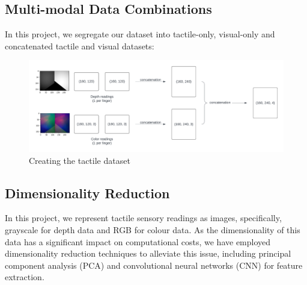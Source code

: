 \documentclass[11pt, a4paper]{report}
\begin{document}
\subsection{Multi-modal Data Combinations}
\label{sec:4.4.1}
In this project, we segregate our dataset into tactile-only, visual-only and concatenated tactile and visual datasets:
\begin{table}[H]
    \centering
    \caption{Dataset combinations}
    \label{tab:4.1}
\end{table}
\begin{figure}[H]
    \centering
    \includegraphics[width=\textwidth]{docs/Project Report/Media/tactile_dataset_creation.png}
    \caption{Creating the tactile dataset}
    \label{fig:4.6}
\end{figure}


\subsection{Dimensionality Reduction}
\label{sec:4.4.2}
In this project, we represent tactile sensory readings as images, specifically, grayscale for depth data and RGB for colour data. As the dimensionality of this data has a significant impact on computational costs, we have employed dimensionality reduction techniques to alleviate this issue, including principal component analysis (PCA) and convolutional neural networks (CNN) for feature extraction.
\end{document}
